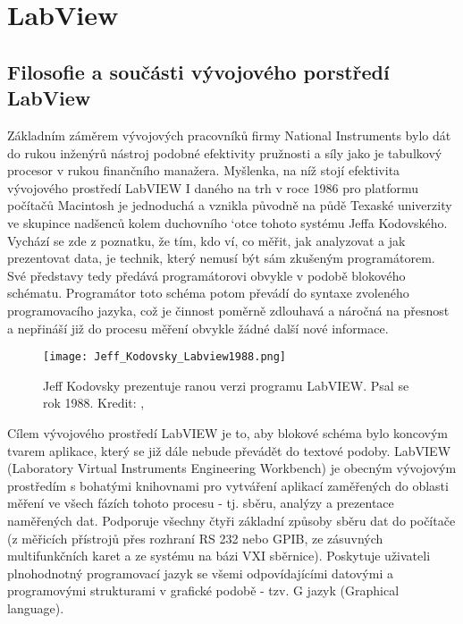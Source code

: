 \chapter{LabView}\label{ES:kap_labview}
\minitoc

  \section{Filosofie a součásti vývojového porstředí LabView }
    Základním záměrem vývojových pracovníků firmy National Instruments bylo dát do rukou inženýrů
    nástroj podobné efektivity pružnosti a síly jako je tabulkový procesor v rukou finančního
    manažera. Myšlenka, na níž stojí efektivita vývojového prostředí LabVIEW I daného na trh v roce
    1986 pro platformu počítačů Macintosh je jednoduchá a vznikla původně na půdě Texaské univerzity
    ve skupince nadšenců kolem duchovního `otce tohoto systému Jeffa Kodovského. Vychází se zde z 
    poznatku, že tím, kdo ví, co měřit, jak analyzovat a jak prezentovat data, je technik, který
    nemusí být sám zkušeným programátorem. Své představy tedy předává programátorovi obvykle v
    podobě blokového schématu. Programátor toto schéma potom převádí do syntaxe zvoleného
    programovacího jazyka, což je činnost poměrně zdlouhavá a náročná na přesnost a nepřináší již do
    procesu měření obvykle žádné další nové informace.
     
    \begin{wrapfigure}{r}{8cm}
      \centering
      \texttt{[image: Jeff\_Kodovsky\_Labview1988.png]}
      \caption{Jeff Kodovsky prezentuje ranou verzi programu LabVIEW. Psal se rok 1988. Kredit:
               \niLabviewHistory, \cite{Kodovsky2011}}
      \label{ems:fig_Kodovsky}
   \end{wrapfigure}
    Cílem vývojového prostředí LabVIEW je to, aby blokové schéma bylo koncovým tvarem aplikace,
    který se již dále nebude převádět do textové podoby. LabVIEW (Laboratory Virtual Instruments
    Engineering Workbench) je obecným vývojovým prostředím s bohatými knihovnami pro vytváření
    aplikací zaměřených do oblasti měření ve všech fázích tohoto procesu - tj. sběru, analýzy a
    prezentace naměřených dat. Podporuje všechny čtyři základní způsoby sběru dat do počítače (z
    měřicích přístrojů přes rozhraní RS 232 nebo GPIB, ze zásuvných multifunkčních karet a ze
    systému na bázi VXI sběrnice). Poskytuje uživateli plnohodnotný programovací jazyk se všemi
    odpovídajícími datovými a programovými strukturami v grafické podobě - tzv. G jazyk (Graphical
    language)\cite[p.~21]{Zidek-2002-ID60}.

